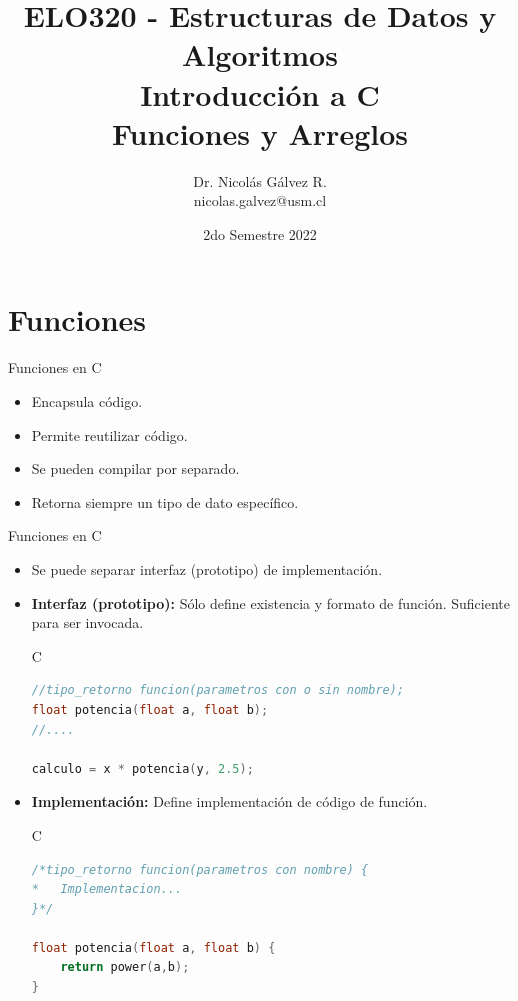 \documentclass{beamer}
\title{ELO320 - Estructuras de Datos y Algoritmos\\Introducción a C\\Funciones y Arreglos}
\author{Dr. Nicolás Gálvez R.\\{\small nicolas.galvez@usm.cl}}
\institute{Ing. Civil Telemática - Departamento de Electrónica}
\date{2do Semestre 2022}
\begin{document}
\frame{\titlepage}

%
%

\section{Funciones}
\begin{frame}[fragile]{Funciones en C}
\begin{itemize}
	\item Encapsula código.
	\item Permite reutilizar código.
	\item Se pueden compilar por separado.
	\item Retorna siempre un tipo de dato específico. 
\end{itemize}
\end{frame}

\begin{frame}[fragile]{Funciones en C}
\begin{itemize}
	\item Se puede separar interfaz (prototipo) de implementación.
	\item \textbf{Interfaz (prototipo):} Sólo define existencia y formato de función. Suficiente para ser invocada.
	\begin{exampleblock}{C}
	\begin{lstlisting}[language=C, basicstyle=\tiny]
//tipo_retorno funcion(parametros con o sin nombre);
float potencia(float a, float b);
//....

calculo = x * potencia(y, 2.5);
\end{lstlisting}\end{exampleblock}
	\item \textbf{Implementación:} Define implementación de código de función.
	\begin{exampleblock}{C}
\begin{lstlisting}[language=C, basicstyle=\tiny]
/*tipo_retorno funcion(parametros con nombre) {
*	Implementacion...
}*/

float potencia(float a, float b) {
	return power(a,b);
}
\end{lstlisting}\end{exampleblock}
\end{itemize}
\end{frame}
\end{document}
